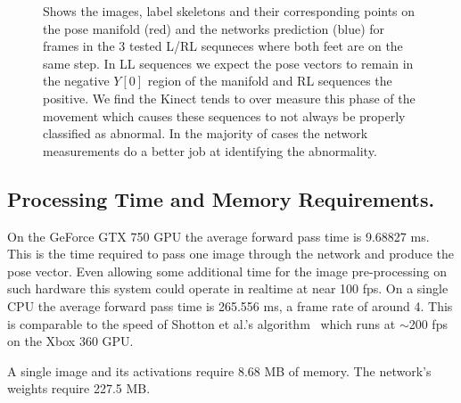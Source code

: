 \documentclass[11pt]{article} %
\begin{document}
\begin{figure}
\qquad%
\caption{Shows the images, label skeletons and their corresponding points on the pose manifold (red) and the networks prediction (blue) for frames in the 3 tested L/RL sequneces where both feet are on the same step. In LL sequences we expect the pose vectors to remain in the negative $Y[0]$ region of the manifold and RL sequences the positive. We find the Kinect tends to over measure this phase of the movement which causes these sequences to not always be properly classified as abnormal. In the majority of cases the network measurements do a better job at identifying the abnormality. }
\label{fig:lrlOverMeasure}
\end{figure}


\subsection{Processing Time and Memory Requirements.}

On the GeForce GTX 750 GPU the average forward pass time is 9.68827 ms. This is the time required to pass one image through the network and produce the pose vector. Even allowing some additional time for the image pre-processing on such hardware this system could operate in realtime at near 100 fps. On a single CPU the average forward pass time is 265.556 ms, a frame rate of around 4. This is comparable to the speed of Shotton et al.'s algorithm~\cite{Shotton2011} which runs at $\sim$200 fps on the Xbox 360 GPU.

 A single image and its activations require 8.68 MB of memory. The network's weights require 227.5 MB. 
\end{document}
